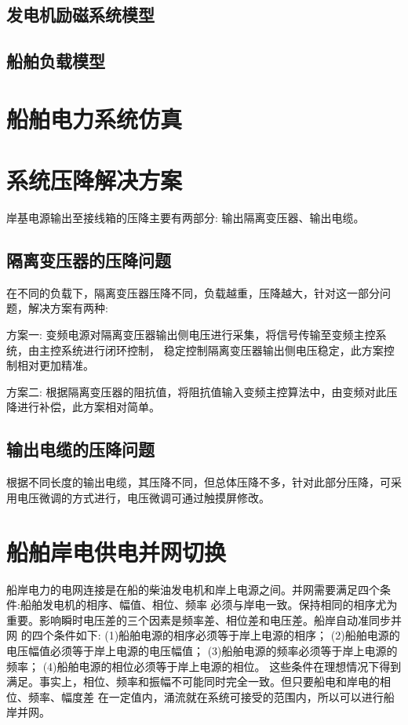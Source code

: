 \subsection{发电机励磁系统模型}

\subsection{船舶负载模型}

\section{船舶电力系统仿真}



\section{系统压降解决方案}

岸基电源输出至接线箱的压降主要有两部分: 输出隔离变压器、输出电缆。

\subsection{隔离变压器的压降问题}

在不同的负载下，隔离变压器压降不同，负载越重，压降越大，针对这一部分问题，解决方案有两种:

方案一: 变频电源对隔离变压器输出侧电压进行采集，将信号传输至变频主控系统，由主控系统进行闭环控制，
稳定控制隔离变压器输出侧电压稳定，此方案控制相对更加精准。

方案二: 根据隔离变压器的阻抗值，将阻抗值输入变频主控算法中，由变频对此压降进行补偿，此方案相对简单。

\subsection{输出电缆的压降问题}

根据不同长度的输出电缆，其压降不同，但总体压降不多，针对此部分压降，可采用电压微调的方式进行，电压微调可通过触摸屏修改。


\section{船舶岸电供电并网切换}
船岸电力的电网连接是在船的柴油发电机和岸上电源之间。并网需要满足四个条件:船舶发电机的相序、幅值、相位、频率
必须与岸电一致。保持相同的相序尤为重要。影响瞬时电压差的三个因素是频率差、相位差和电压差。船岸自动准同步并网
的四个条件如下:
(1)船舶电源的相序必须等于岸上电源的相序；
(2)船舶电源的电压幅值必须等于岸上电源的电压幅值；
(3)船舶电源的频率必须等于岸上电源的频率；
(4)船舶电源的相位必须等于岸上电源的相位。
这些条件在理想情况下得到满足。事实上，相位、频率和振幅不可能同时完全一致。但只要船电和岸电的相位、频率、幅度差
在一定值内，涌流就在系统可接受的范围内，所以可以进行船岸并网。


